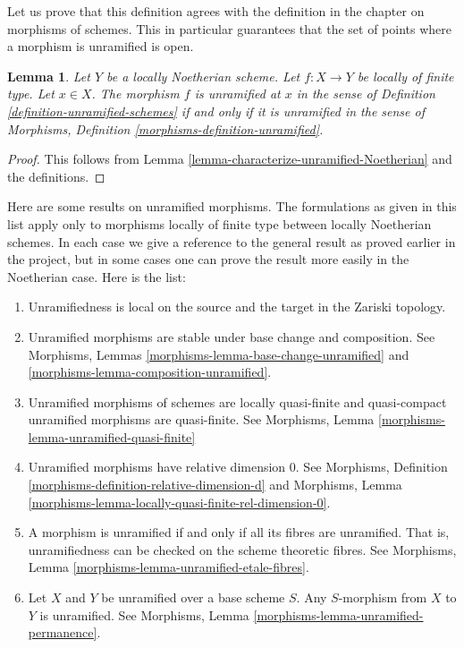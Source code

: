 \documentclass{stacks-project}
\theoremstyle{plain}
\newtheorem{lemma}[subsection]{Lemma}
\theoremstyle{definition}
\theoremstyle{remark}
\numberwithin{equation}{subsection}
\begin{document}
\noindent
Let us prove that this definition agrees with the definition in the
chapter on morphisms of schemes. This in particular guarantees that the
set of points where a morphism is unramified is open.

\begin{lemma}
\label{lemma-unramified-definition}
Let $Y$ be a locally Noetherian scheme.
Let $f : X \to Y$ be locally of finite type.
Let $x \in X$. The morphism $f$ is unramified at $x$ in
the sense of Definition \ref{definition-unramified-schemes}
if and only if it is unramified in
the sense of Morphisms, Definition \ref{morphisms-definition-unramified}.
\end{lemma}

\begin{proof}
This follows from Lemma \ref{lemma-characterize-unramified-Noetherian}
and the definitions.
\end{proof}

\noindent
Here are some results on unramified morphisms.
The formulations as given in this list apply only to
morphisms locally of finite type between locally Noetherian schemes.
In each case we give a reference to the general result as
proved earlier in the project, but in some cases one can
prove the result more easily in the Noetherian case.
Here is the list:
\begin{enumerate}
\item Unramifiedness is local on the source and the target in the Zariski
topology.
\item Unramified morphisms are stable under base change and composition.
See Morphisms, Lemmas \ref{morphisms-lemma-base-change-unramified}
and \ref{morphisms-lemma-composition-unramified}.
\item Unramified morphisms of schemes are locally quasi-finite
and quasi-compact unramified morphisms are quasi-finite.
See Morphisms, Lemma \ref{morphisms-lemma-unramified-quasi-finite}
\item Unramified morphisms have relative dimension $0$. See
Morphisms, Definition \ref{morphisms-definition-relative-dimension-d}
and
Morphisms, Lemma \ref{morphisms-lemma-locally-quasi-finite-rel-dimension-0}.
\item A morphism is unramified if and only if all its fibres are unramified.
That is, unramifiedness can be checked on the scheme theoretic fibres. See
Morphisms, Lemma \ref{morphisms-lemma-unramified-etale-fibres}.
\item Let $X$ and $Y$ be unramified over a base scheme $S$.
Any $S$-morphism from $X$ to $Y$ is unramified.
See Morphisms, Lemma \ref{morphisms-lemma-unramified-permanence}.
\end{enumerate}
\end{document}
